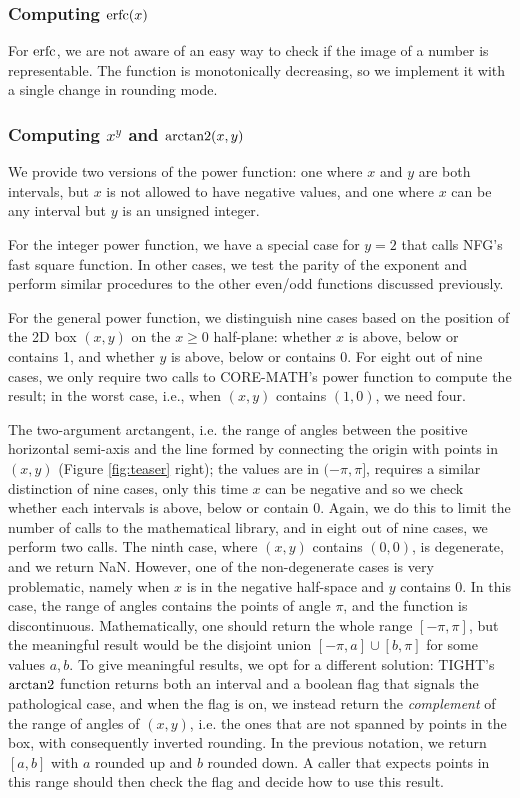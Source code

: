 \subsubsection{Computing $\operatorname{erfc}(x)$}
For $\operatorname{erfc}$, we are not aware of an easy way to check if the image of a number is representable. The function is monotonically decreasing, so we implement it with a single change in rounding mode.

\subsubsection{Computing $x^y$ and $\operatorname{arctan2}(x,y)$}
We provide two versions of the power function: one where $x$ and $y$ are both intervals, but $x$ is not allowed to have negative values, and one where $x$ can be any interval but $y$ is an unsigned integer.

For the integer power function, we have a special case for $y=2$ that calls NFG's fast square function. In other cases, we test the parity of the exponent and perform similar procedures to the other even/odd functions discussed previously.

For the general power function, we distinguish nine cases based on the position of the 2D box $(x,y)$ on the $x\geq0$ half-plane: whether $x$ is above, below or contains 1, and whether $y$ is above, below or contains 0.
For eight out of nine cases, we only require two calls to CORE-MATH's power function to compute the result; in the worst case, i.e., when $(x,y)$ contains $(1,0)$, we need four.

The two-argument arctangent, i.e. the range of angles between the positive horizontal semi-axis and the line formed by connecting the origin with points in $(x,y)$ (Figure \ref{fig:teaser} right); the values are in $(-\pi,\pi]$, requires a similar distinction of nine cases, only this time $x$ can be negative and so we check whether each intervals is above, below or contain 0.
Again, we do this to limit the number of calls to the mathematical library, and in eight out of nine cases, we perform two calls. The ninth case, where $(x,y)$ contains $(0,0)$, is degenerate, and we return NaN.
However, one of the non-degenerate cases is very problematic, namely when $x$ is in the negative half-space and $y$ contains 0. In this case, the range of angles contains the points of angle $\pi$, and the function is discontinuous. Mathematically, one should return the whole range $[-\pi,\pi]$, but the meaningful result would be the disjoint union $[-\pi, a]\cup[b, \pi]$ for some values $a,b$.
To give meaningful results, we opt for a different solution: TIGHT's $\operatorname{arctan2}$ function returns both an interval and a boolean flag that signals the pathological case, and when the flag is on, we instead return the \emph{complement} of the range of angles of $(x,y)$, i.e. the ones that are not spanned by points in the box, with consequently inverted rounding. In the previous notation, we return $[a,b]$ with $a$ rounded up and $b$ rounded down. A caller that expects points in this range should then check the flag and decide how to use this result.
